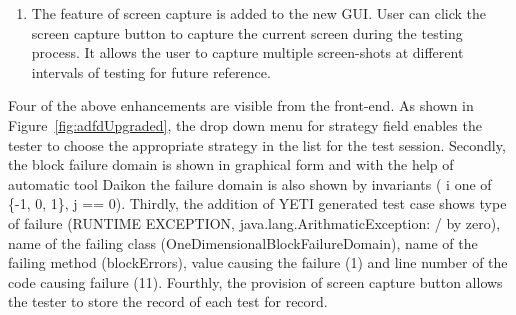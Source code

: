 \begin{enumerate}


\item The feature of screen capture is added to the new GUI. User can click the screen capture button to capture the current screen during the testing process. It allows the user to capture multiple screen-shots at different intervals of testing for future reference. 

\end{enumerate}
\bigskip



Four of the above enhancements are visible from the front-end. As shown in Figure~\ref{fig:adfdUpgraded}, the drop down menu for strategy field enables the tester to choose the appropriate strategy in the list for the test session. Secondly, the block failure domain is shown in graphical form and with the help of automatic tool Daikon the failure domain is also shown  by invariants ( i one of \{-1, 0, 1\}, j == 0). Thirdly, the addition of YETI generated test case shows type of failure (RUNTIME EXCEPTION, java.lang.ArithmaticException: / by zero), name of the failing class (OneDimensionalBlockFailureDomain), name of the failing method (blockErrors), value causing the failure (1) and line number of the code causing failure (11). Fourthly, the provision of screen capture button allows the tester to store the record of each test for record.
\clearpage
\newpage


